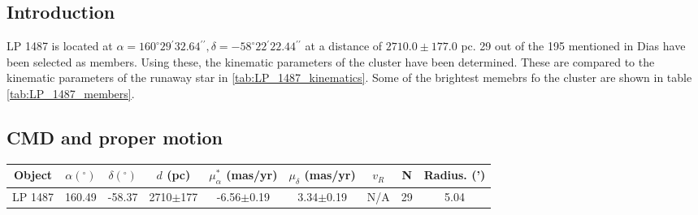 \subsection{Introduction}
    LP 1487 is located at $\alpha = 160^\circ29{}^\prime32.64{}^{\prime\prime}, \delta = -58^\circ22{}^\prime22.44{}^{\prime\prime}$ at a distance of $2710.0\pm177.0$ pc.
    29 out of the 195 mentioned in Dias have been selected as members. Using these, the kinematic parameters of the cluster have been determined. These are compared to the kinematic parameters of the runaway star in \ref{tab:LP_1487_kinematics}. Some of the brightest memebrs fo the cluster are shown in table \ref{tab:LP_1487_members}.
    
    \subsection{CMD and proper motion}
    
    
    

\begin{table*}[h]
\caption{Kinematic parameters of LP 1487}
\label{tab:LP_1487_kinematics}
\begin{tabular}{ccccccccc}
\hline
Object & $\alpha (^\circ)$ & $\delta (^\circ)$ & $d$ (pc) & $\mu_{\alpha}^*$ (mas/yr) & $\mu_{\delta}$ (mas/yr) & $v_R$ & N & Radius. (') \\
\hline
LP 1487 & 160.49 & -58.37 & 2710$\pm$177 & -6.56$\pm$0.19 & 3.34$\pm$0.19 & N/A & 29 & 5.04 \\
\hline
\end{tabular}
\end{table*}



